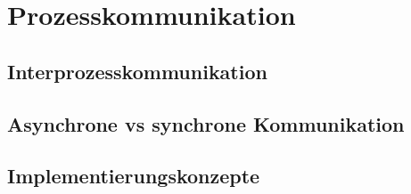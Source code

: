 \section{Prozesskommunikation}

\subsection{Interprozesskommunikation}

\subsection{Asynchrone vs synchrone Kommunikation}

\subsection{Implementierungskonzepte}
